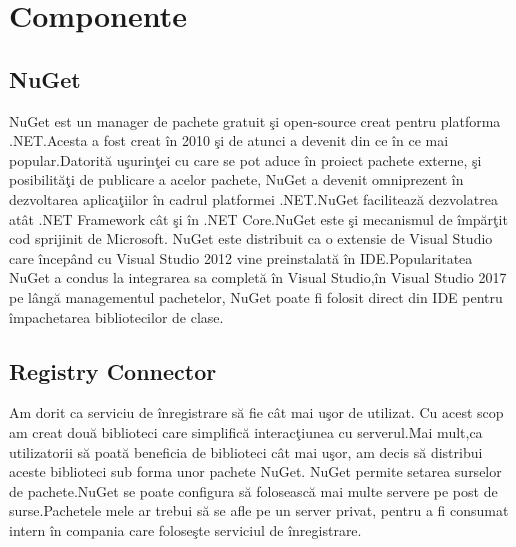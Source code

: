 \documentclass[a4paper,12pt]{report}
\begin{document}
\section{Componente}

\subsection{NuGet}

NuGet est un manager de pachete gratuit \c si open-source creat pentru platforma .NET.Acesta a fost creat \^in 2010
\c si de atunci a devenit din ce \^in ce mai popular.Datorit\u a u\c surin\c tei cu care se pot aduce \^in proiect 
pachete externe, \c si posibilit\u a\c ti de publicare a acelor pachete, NuGet a devenit omniprezent \^in 
dezvoltarea aplica\c tiilor \^in cadrul platformei .NET.NuGet faciliteaz\u a dezvolatrea at\^at .NET Framework
c\^at \c si \^in .NET Core.NuGet este \c si mecanismul de \^imp\u ar\c tit cod sprijinit de Microsoft.
NuGet este distribuit ca o extensie de Visual Studio care \^incep\^and cu Visual Studio 2012 vine preinstalat\u a
\^in IDE.Popularitatea NuGet a condus la integrarea sa complet\u a \^in Visual Studio,\^in Visual Studio 2017 pe 
l\^ang\u a managementul pachetelor, NuGet poate fi folosit direct din IDE pentru \^impachetarea bibliotecilor
de clase.

\subsection{Registry Connector}

Am dorit ca serviciu de \^inregistrare s\u a fie c\^at mai u\c sor de utilizat.
Cu acest scop am creat dou\u a biblioteci care simplific\u a interac\c tiunea cu 
serverul.Mai mult,ca utilizatorii s\u a poat\u a beneficia de biblioteci c\^at mai 
u\c sor, am decis s\u a distribui aceste biblioteci sub forma unor pachete NuGet.
NuGet permite setarea surselor de pachete.NuGet se poate configura s\u a foloseasc\u a
mai multe servere pe post de surse.Pachetele mele ar trebui s\u a se afle pe un server 
privat, pentru a fi consumat intern \^in compania care folose\c ste serviciul de \^inregistrare.
\end{document}
